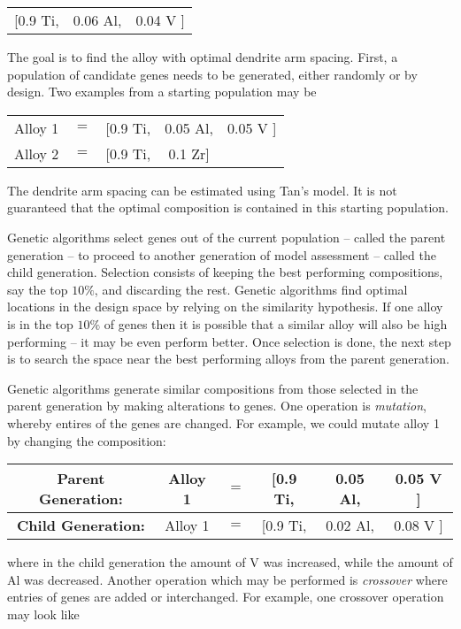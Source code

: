 \begin{table}[h!]
\begin{tabular}{ccc}
	 [0.9 Ti,  & 0.06 Al, & 0.04 V ] \\
\end{tabular}
\end{table}
The goal is to find the alloy with optimal dendrite arm spacing. First, a population of candidate genes needs to be generated, either randomly or by design. Two examples from a starting population may be

\begin{table}[h!]
\begin{center}
\begin{tabular}{ccccc}
	Alloy 1 & $=$ & [0.9 Ti, & 0.05 Al, & 0.05 V ] \\
	Alloy 2 & $=$ & [0.9 Ti, & 0.1 Zr] & \\
\end{tabular}
\end{center}
\end{table}
The dendrite arm spacing can be estimated using Tan's model. It is not guaranteed that the optimal composition is contained in this starting population.

Genetic algorithms select genes out of the current population -- called the parent generation --  to proceed to another generation of model assessment -- called the child generation. Selection consists of keeping the best performing compositions, say the top $10\%$, and discarding the rest. Genetic algorithms find optimal locations in the design space by relying on the similarity hypothesis. If one alloy is in the top $10\%$ of genes then it is possible that a similar alloy will also be high performing -- it may be even perform better. Once selection is done, the next step is to search the space near the best performing alloys from the parent generation.

Genetic algorithms generate similar compositions from those selected in the parent generation by making alterations to genes. One operation is \textit{mutation}, whereby entires of the genes are changed. For example, we could mutate alloy 1 by changing the composition:

\begin{table}[h!]
\begin{center}
\begin{tabular}{c|ccccc}
	\textbf{Parent Generation:} & Alloy 1 & $=$ & [0.9 Ti, & {\color{red}0.05} Al, & {\color{red}0.05} V ] \\ \hline
	\textbf{Child Generation:} & Alloy 1 & $=$ & [0.9 Ti, & {\color{green}0.02} Al, & {\color{green}0.08} V  ]  \\ 
\end{tabular}
\end{center}
\end{table}
where in the child generation the amount of V was increased, while the amount of Al was decreased. Another operation which may be performed is \textit{crossover} where entries of genes are added or interchanged. For example, one crossover operation may look like


